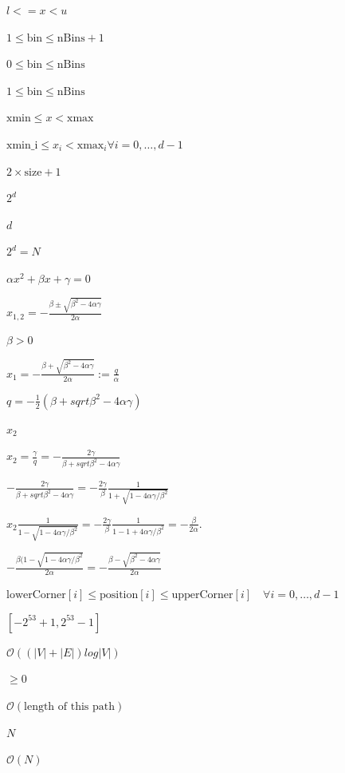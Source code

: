 \documentclass{article}
\begin{document}
$l <= x < u$
\pagebreak

$1 \le \text{bin} \le \text{nBins} + 1$
\pagebreak

$0 \le \text{bin} \le \text{nBins}$
\pagebreak

$1 \le \text{bin} \le \text{nBins}$
\pagebreak

$\text{xmin} \le x < \text{xmax}$
\pagebreak

$\text{xmin_i} \le x_i < \text{xmax}_i \forall i=0, \dots, d-1$
\pagebreak

$2 \times \text{size}+1$
\pagebreak

$2^d$
\pagebreak

$d$
\pagebreak

$2^d = N $
\pagebreak

$ \alpha x^{2} + \beta x + \gamma = 0 $
\pagebreak

$ x_{1, 2} = - \frac{\beta \pm \sqrt{\beta^{2}-4\alpha\gamma}}{2\alpha}$
\pagebreak

$ \beta > 0 $
\pagebreak

$ x_{1} = - \frac{\beta + \sqrt{\beta^{2}-4\alpha\gamma}}{2\alpha} := \frac{q}{\alpha}$
\pagebreak

$ q= -\frac{1}{2}(\beta+sqrt{\beta^{2}-4\alpha\gamma})$
\pagebreak

$ x_{2} $
\pagebreak

$ x_{2} = \frac{\gamma}{q} = -\frac{2\gamma}{\beta+sqrt{\beta^{2}-4\alpha\gamma}}$
\pagebreak

$ -\frac{2\gamma}{\beta+sqrt{\beta^{2}-4\alpha\gamma}} = -\frac{2\gamma}{\beta}\frac{1}{1+\sqrt{1-4\alpha\gamma/\beta^{2}}}$
\pagebreak

$ x_{2}\frac{1}{1-\sqrt{1-4\alpha\gamma/\beta^{2}}} = -\frac{2\gamma}{\beta}\frac{1}{1-1+4\alpha\gamma/\beta^{2}}=-\frac{\beta}{2\alpha}.$
\pagebreak

$ -\frac{\beta(1-\sqrt{1-4\alpha\gamma/\beta^{2}}}{2\alpha} = - \frac{\beta - \sqrt{\beta^{2}-4\alpha\gamma}}{2\alpha} $
\pagebreak

$\text{lowerCorner}[i] \le \text{position}[i] \le \text{upperCorner}[i] \quad \forall i=0, \dots, d-1$
\pagebreak

$[-2^{53}+1, 2^{53}-1]$
\pagebreak

$\mathcal{O}((|V| + |E|) log |V|)$
\pagebreak

$\ge 0$
\pagebreak

$\mathcal{O}(\mbox{length of this path})$
\pagebreak

$N$
\pagebreak

$\mathcal{O}(N)$
\pagebreak
\end{document}
